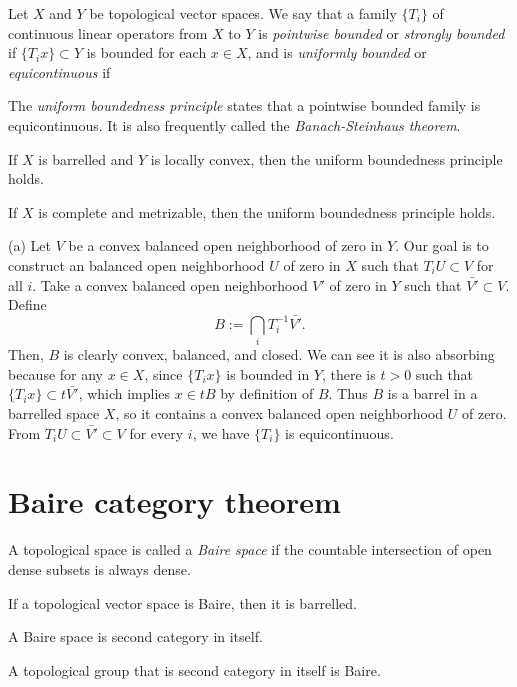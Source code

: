 \documentclass{../../large}
\begin{document}
\begin{prb}
Let $X$ and $Y$ be topological vector spaces.
We say that a family $\{T_i\}$ of continuous linear operators from $X$ to $Y$ is \emph{pointwise bounded} or \emph{strongly bounded} if $\{T_ix\}\subset Y$ is bounded for each $x\in X$, and is \emph{uniformly bounded} or \emph{equicontinuous} if 

The \emph{uniform boundedness principle} states that a pointwise bounded family is equicontinuous.
It is also frequently called the \emph{Banach-Steinhaus theorem}.
\begin{parts}
\item If $X$ is barrelled and $Y$ is locally convex, then the uniform boundedness principle holds.
\item If $X$ is complete and metrizable, then the uniform boundedness principle holds.
\end{parts}
\end{prb}
\begin{pf}
(a)
Let $V$ be a convex balanced open neighborhood of zero in $Y$.
Our goal is to construct an balanced open neighborhood $U$ of zero in $X$ such that $T_iU\subset V$ for all $i$.
Take a convex balanced open neighborhood $V'$ of zero in $Y$ such that $\bar{V'}\subset V$.
Define
\[B:=\bigcap_iT_i^{-1}\bar{V'}.\]
Then, $B$ is clearly convex, balanced, and closed.
We can see it is also absorbing because for any $x\in X$, since $\{T_ix\}$ is bounded in $Y$, there is $t>0$ such that $\{T_ix\}\subset t\bar{V'}$, which implies $x\in tB$ by definition of $B$.
Thus $B$ is a barrel in a barrelled space $X$, so it contains a convex balanced open neighborhood $U$ of zero.
From $T_iU\subset\bar{V'}\subset V$ for every $i$, we have $\{T_i\}$ is equicontinuous.
\end{pf}



\section{Baire category theorem}

\begin{prb}
A topological space is called a \emph{Baire space} if the countable intersection of open dense subsets is always dense.
\begin{parts}
\item If a topological vector space is Baire, then it is barrelled.
\item A Baire space is second category in itself.
\item A topological group that is second category in itself is Baire.
\end{parts}
\end{prb}
\end{document}
